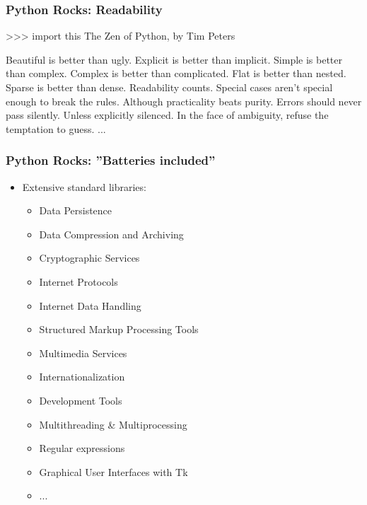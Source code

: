 \documentclass[t,10pt,compress=false,usepdftitle=false]{beamer}
\begin{document}
\begin{frame}[fragile]
    \frametitle{Python Rocks: Readability}
\begin{myColorBox}{0.9}{}
\begin{semiverbatim}
\small
>>> import this
The Zen of Python, by Tim Peters

Beautiful is better than ugly.
Explicit is better than implicit.
Simple is better than complex.
Complex is better than complicated.
Flat is better than nested.
Sparse is better than dense.
Readability counts.
Special cases aren't special enough to break the rules.
Although practicality beats purity.
Errors should never pass silently.
Unless explicitly silenced.
In the face of ambiguity, refuse the temptation to guess.
...
\end{semiverbatim}
\end{myColorBox}
\end{frame}

\begin{frame}[fragile]
    \frametitle{Python Rocks: ''Batteries included''}
    \begin{itemize}
        \item Extensive standard libraries:
        \begin{itemize}
	    \item Data Persistence
	\item Data Compression and Archiving
	\item Cryptographic Services
	\item Internet Protocols
	\item Internet Data Handling
	\item Structured Markup Processing Tools
	\item Multimedia Services
	\item Internationalization
	\item Development Tools
	\item Multithreading \& Multiprocessing
	\item Regular expressions
	\item Graphical User Interfaces with Tk
	    \item ...
        \end{itemize}
    \end{itemize}
\end{frame}
\end{document}
